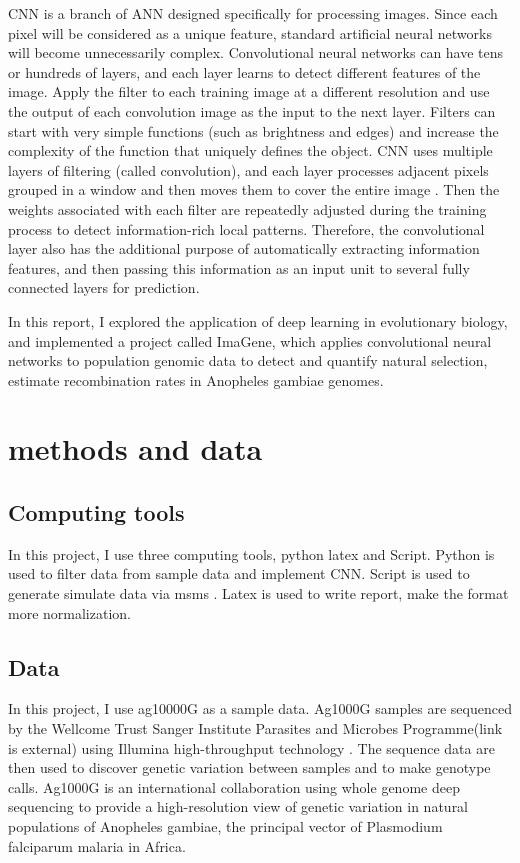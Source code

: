\documentclass[11pt,a4 paper,title page]{article}
\begin{document}
  CNN is a branch of ANN designed specifically for processing images. Since each pixel will be considered as a unique feature, standard artificial neural networks will become unnecessarily complex. Convolutional neural networks can have tens or hundreds of layers, and each layer learns to detect different features of the image. Apply the filter to each training image at a different resolution and use the output of each convolution image as the input to the next layer. Filters can start with very simple functions (such as brightness and edges) and increase the complexity of the function that uniquely defines the object. CNN uses multiple layers of filtering (called convolution), and each layer processes adjacent pixels grouped in a window and then moves them to cover the entire image \cite{ karpathy2016convolutional}. Then the weights associated with each filter are repeatedly adjusted during the training process to detect information-rich local patterns. Therefore, the convolutional layer also has the additional purpose of automatically extracting information features, and then passing this information as an input unit to several fully connected layers for prediction.
  \hfill\break
  
  In this report, I explored the application of deep learning in evolutionary biology, and implemented a project called ImaGene, which applies convolutional neural networks to population genomic data to detect and quantify natural selection, estimate recombination rates in Anopheles gambiae genomes.
  \hfill\break
  \section{methods and data}

    \subsection{Computing tools}
  In this project, I use three computing tools, python latex and Script. Python is used to filter data from sample data and implement CNN. Script is used to generate simulate data via msms \cite{ ewing2010msms}. Latex is used to write report, make the format more normalization.
  \hfill\break
    \subsection{Data}
  In this project, I use ag10000G as a sample data. Ag1000G samples are sequenced by the Wellcome Trust Sanger Institute Parasites and Microbes Programme(link is external) using Illumina high-throughput technology \cite{ anopheles2014ag1000g}. The sequence data are then used to discover genetic variation between samples and to make genotype calls. Ag1000G is an international collaboration using whole genome deep sequencing to provide a high-resolution view of genetic variation in natural populations of Anopheles gambiae, the principal vector of Plasmodium falciparum malaria in Africa.
  \hfill\break
\end{document}

